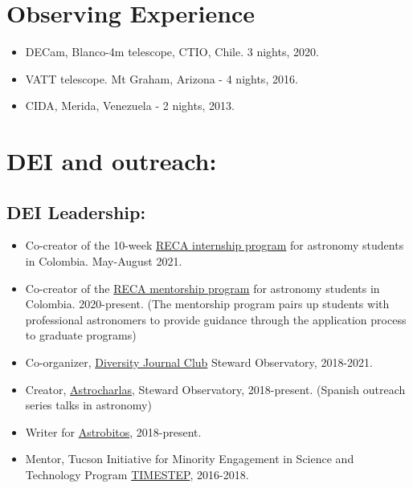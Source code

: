 \documentclass[UTF8]{article}
\begin{document}
\section*{Observing Experience}
\begin{itemize}
  \setlength\itemsep{0.0em}
  \renewcommand\labelitemi{$\cdot$}
    \item DECam, Blanco-4m telescope, CTIO, Chile. 3 nights, 2020.
    \item VATT telescope. Mt Graham, Arizona - 4 nights, 2016.
    \item CIDA, Merida, Venezuela - 2 nights, 2013.
\end{itemize}

\section*{DEI and outreach:}


\subsection*{DEI Leadership:}
\begin{itemize}
  \setlength\itemsep{0.0em}
  \renewcommand\labelitemi{$\cdot$}
\item Co-creator of the 10-week
  \href{https://recastronomia.github.io/internship/}{RECA internship program}
  for astronomy students in Colombia. May-August 2021.
\item Co-creator of the \href{https://recastronomia.github.io/mentores/}{RECA mentorship program} for astronomy students in Colombia. 2020-present.
  (The mentorship program pairs up students with professional astronomers to
  provide guidance through the application process to graduate programs)
\item Co-organizer,
  \href{https://www.as.arizona.edu/diversity_coffee/}{Diversity Journal Club} Steward Observatory, 2018-2021.
\item Creator, \href{https://astrocharlas.github.io/}{Astrocharlas},
Steward Observatory, 2018-present.
 (Spanish outreach series talks in astronomy)
\item Writer for \href{https://astrobitos.org/}{Astrobitos}, 2018-present.
\item Mentor, Tucson Initiative for Minority Engagement in Science and Technology Program \href{https://lavinia.as.arizona.edu/~timestep/}{TIMESTEP}, 2016-2018.
\end{itemize}
\end{document}
